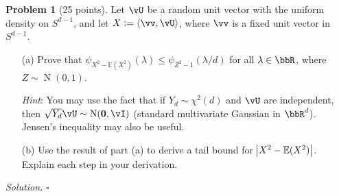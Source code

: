 \documentclass[11pt]{article}
\newcommand\ip[1]{\langle #1 \rangle} %
\newcommand{\E}{\ensuremath{\mathbb{E}}} %
\newcommand{\unitsphere}[1][d-1]{\ensuremath{S^{#1}}} %
\newcommand{\logmgf}[1]{\ensuremath{\psi_{#1}}} %
\newcommand{\Normal}{\ensuremath{\operatorname{N}}} %
\theoremstyle{definition}
\newtheorem{problem}{Problem}
\newenvironment{solution}{\noindent\emph{Solution.}}{\hfill$\square$}
\begin{document}
\begin{problem}[25 points]
  Let $\vU$ be a random unit vector with the uniform density on $\unitsphere$, and let $X := \ip{\vv,\vU}$, where $\vv$ is a fixed unit vector in
  $\unitsphere$.
  \begin{enumerate}
    \item[(a)]
      Prove that $\logmgf{X^2-\E(X^2)}(\lambda) \leq \logmgf{Z^2-1}(\lambda/d)$
      for all $\lambda \in \bbR$, where $Z \sim \Normal(0,1)$.

      \emph{Hint}: You may use the fact that if $Y_d \sim \chi^2(d)$ and $\vU$ are independent, then $\sqrt{Y_d}\vU \sim \Normal(\boldsymbol0,\vI)$ (standard multivariate Gaussian in $\bbR^d$).
      Jensen's inequality may also be useful.

    \item[(b)]
      Use the result of part (a) to derive a tail bound for $\abs{X^2-\E(X^2)}$.
      Explain each step in your derivation.

  \end{enumerate}
\end{problem}

\begin{solution}
\end{solution}

\newpage

\end{document}
